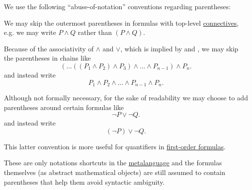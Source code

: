 \begin{remark}\label{rem:propositional_formula_parentheses}
  We use the following \enquote{abuse-of-notation} conventions regarding parentheses:
  \begin{thmenum}
     We may skip the outermost parentheses in formulas with top-level \hyperref[def:propositional_language/connectives]{connectives}, e.g. we may write \( P \wedge Q \) rather than \( (P \wedge Q) \).

     Because of the associativity of \( \wedge \) and \( \vee \), which is implied by  and , we may skip the parentheses in chains like
    \begin{equation*}
      ( \ldots ((P_1 \wedge P_2) \wedge P_3) \wedge \ldots \wedge P_{n-1} ) \wedge P_n.
    \end{equation*}
    and instead write
    \begin{equation*}
      P_1 \wedge P_2 \wedge \ldots \wedge P_{n-1} \wedge P_n.
    \end{equation*}

     Although not formally necessary, for the sake of readability we may choose to add parentheses around certain formulas like
    \begin{equation*}
      \neg P \vee \neg Q.
    \end{equation*}
    and instead write
    \begin{equation*}
      (\neg P) \vee \neg Q.
    \end{equation*}

    This latter convention is more useful for quantifiers in \hyperref[def:first_order_syntax/formula]{first-order formulas}.
  \end{thmenum}

  These are only notations shortcuts in the \hyperref[rem:metalogic]{metalanguage} and the formulas themselves (as abstract mathematical objects) are still assumed to contain parentheses that help them avoid syntactic ambiguity.
\end{remark}

